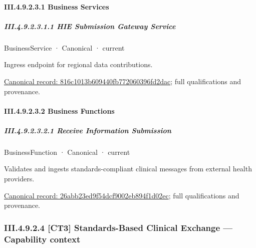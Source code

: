\paragraph*{III.4.9.2.3.1 Business Services}
\label{navigation:III.4.9.2.3.1}

\subparagraph*{III.4.9.2.3.1.1 HIE Submission Gateway Service}
\label{navigation:III.4.9.2.3.1.1}

\label{element:816c1013b609440fb772060396fd2dac}
{\small BusinessService · Canonical · current}\par

Ingress endpoint for regional data contributions.


{\footnotesize \href{../../../../../../../../continuum/business/business-service/816c1013b609440fb772060396fd2dac.md}{Canonical record: 816c1013b609440fb772060396fd2dac}; full qualifications and provenance.}\par
\paragraph*{III.4.9.2.3.2 Business Functions}
\label{navigation:III.4.9.2.3.2}

\subparagraph*{III.4.9.2.3.2.1 Receive Information Submission}
\label{navigation:III.4.9.2.3.2.1}

\label{element:26abb23ed9f54dcf9002eb894f1d02ec}
{\small BusinessFunction · Canonical · current}\par

Validates and ingests standards-compliant clinical messages from external health providers.


{\footnotesize \href{../../../../../../../../continuum/business/business-function/26abb23ed9f54dcf9002eb894f1d02ec.md}{Canonical record: 26abb23ed9f54dcf9002eb894f1d02ec}; full qualifications and provenance.}\par
\subsubsection*{III.4.9.2.4 [CT3] Standards-Based Clinical Exchange — Capability context}
\label{navigation:III.4.9.2.4}

